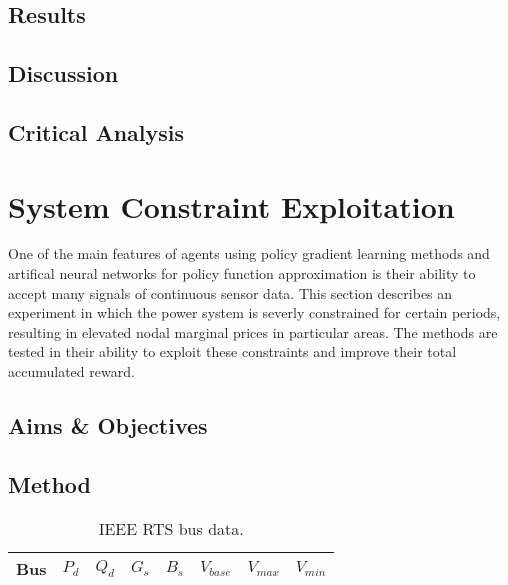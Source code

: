 \section{Results}
\section{Discussion}
\section{Critical Analysis}

\chapter{System Constraint Exploitation}
\label{ch:exploitation}
One of the main features of agents using policy gradient learning methods and
artifical neural networks for policy function approximation is their ability to
accept many signals of continuous sensor data.  This section describes an
experiment in which the power system is severly constrained for certain
periods, resulting in elevated nodal marginal prices in particular areas.  The
methods are tested in their ability to exploit these constraints and improve
their total accumulated reward.

\section{Aims \& Objectives}


%

\section{Method}

\begin{table}
\begin{center}
\begin{tabular}{c|c|c|c|c|c|c|c}
\hline
Bus &$P_d$ &$Q_d$ &$G_s$ &$B_s$ &$V_{base}$ &$V_{max}$ &$V_{min}$\\
\hline\hline

\hline
\end{tabular}
\caption{IEEE RTS bus data.}
\label{tbl:rtsbus}
\end{center}
\end{table}

